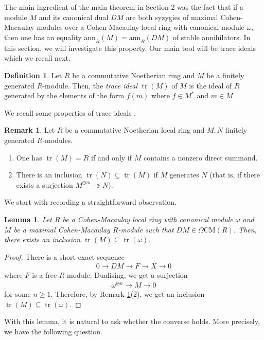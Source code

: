 \documentclass[12pt]{amsart}
\newcommand{\sann}{\underline{\mathrm{ann}}}
\newcommand{\CM}{\mathrm{CM}}
\newtheorem{lemma}[theorem]{Lemma}
\theoremstyle{definition}
\newtheorem{definition}[theorem]{Definition}
\newtheorem{remark}[theorem]{Remark}
\numberwithin{equation}{theorem}
\DeclareMathOperator{\tr}{\mathrm{tr}}
\begin{document}
The main ingredient of the main theorem in Section 2 was the fact that if a module $M$ and its canonical dual $DM$ are both syzygies of maximal Cohen-Macaulay modules over a Cohen-Macaulay local ring with canonical module $\omega$, then one has an equality $\sann_R(M) = \sann_R(DM)$ of stable annihilators. In this section, we will investigate this property. Our main tool will be trace ideals which we recall next.
\begin{definition}
    Let $R$ be a commutative Noetherian ring and $M$ be a finitely generated $R$-module. Then, the \textit{trace ideal} $\tr(M)$ of $M$ is the ideal of $R$ generated by the elements of the form $f(m)$ where $f \in M^*$ and $m \in M$. 
\end{definition}
We recall some properties of trace ideals \cite[Proposition 2.8]{Lindo-centers}.
\begin{remark}\label{remark-trace}
    Let $R$ be a commutative Noetherian local ring and $M, N$ finitely generated $R$-modules.
    \begin{enumerate}
        \item One has $\tr(M) = R$ if and only if $M$ contains a nonzero direct summand.
        \item There is an inclusion $\tr(N) \subseteq \tr(M)$ if $M$ generates $N$ (that is, if there exists a surjection $M^{\oplus m} \twoheadrightarrow N$).  
    \end{enumerate}
\end{remark}
We start with recording a straightforward observation.
\begin{lemma}\label{lemma-where-the-trace-is-contained-in-canonical-trace}
    Let $R$ be a Cohen-Macaulay local ring with canonical module $\omega$ and $M$ be a maximal Cohen-Macaulay $R$-module such that $DM \in \Omega \CM(R)$. Then, there exists an inclusion $\tr(M) \subseteq \tr(\omega)$.  
\end{lemma}
\begin{proof}
    There is a short exact sequence 
    \begin{align*}
    0 \to DM \to F \to X \to 0
    \end{align*}
    where $F$ is a free $R$-module. Dualising, we get a surjection 
    \begin{align*}
    \omega^{\oplus n} \to M \to 0
    \end{align*}
    for some $n \geq 1$. Therefore, by Remark \ref{remark-trace}(2), we get an inclusion $\tr(M) \subseteq \tr(\omega)$.
\end{proof}
With this lemma, it is natural to ask whether the converse holds. More precisely, we have the following question.
\end{document}
